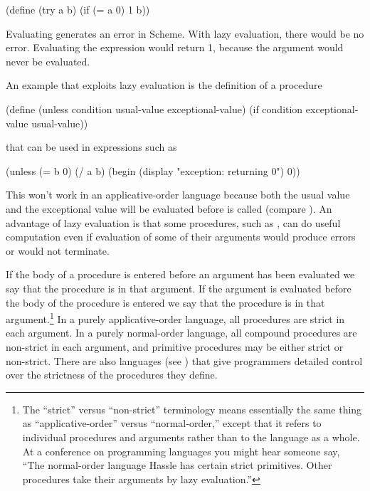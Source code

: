 \begin{codeBlock}
(define (try a b) (if (= a 0) 1 b))
\end{codeBlock}

\noindent
Evaluating  generates an error in Scheme.  With lazy
evaluation, there would be no error.  Evaluating the expression would return 1,
because the argument  would never be evaluated.

An example that exploits lazy evaluation is the definition of a procedure

\begin{codeBlock}
(define (unless condition usual-value exceptional-value)
  (if condition exceptional-value usual-value))
\end{codeBlock}

\noindent
that can be used in expressions such as

\begin{codeBlock}
(unless (= b 0)
        (/ a b)
        (begin (display "exception: returning 0") 0))
\end{codeBlock}

\noindent
This won't work in an applicative-order language because both the usual value
and the exceptional value will be evaluated before  is called
(compare ).  An advantage of lazy evaluation is that some
procedures, such as , can do useful computation even if evaluation
of some of their arguments would produce errors or would not terminate.

If the body of a procedure is entered before an argument has been evaluated we
say that the procedure is  in that argument.  If the
argument is evaluated before the body of the procedure is entered we say that
the procedure is  in that argument.\footnote{The ``strict''
versus ``non-strict'' terminology means essentially the same thing as
``applicative-order'' versus ``normal-order,'' except that it refers to
individual procedures and arguments rather than to the language as a whole.  At
a conference on programming languages you might hear someone say, ``The
normal-order language Hassle has certain strict primitives.  Other procedures
take their arguments by lazy evaluation.''}  In a purely applicative-order
language, all procedures are strict in each argument.  In a purely normal-order
language, all compound procedures are non-strict in each argument, and
primitive procedures may be either strict or non-strict.  There are also
languages (see ) that give programmers detailed control over
the strictness of the procedures they define.

